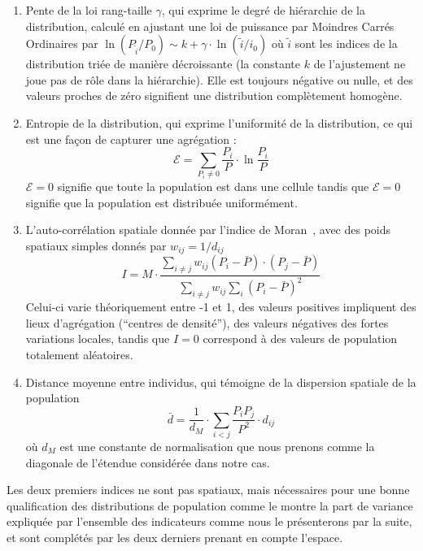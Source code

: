 {\begin{enumerate}
\item Pente de la loi rang-taille $\gamma$, qui exprime le degré de hiérarchie de la distribution, calculé en ajustant une loi de puissance par Moindres Carrés Ordinaires par $\ln \left( P_{\tilde{i}}/P_0\right) \sim k + \gamma\cdot \ln \left(\tilde{i}/i_0\right)$ où $\tilde{i}$ sont les indices de la distribution triée de manière décroissante (la constante $k$ de l'ajustement ne joue pas de rôle dans la hiérarchie). Elle est toujours négative ou nulle, et des valeurs proches de zéro signifient une distribution complètement homogène.
\item Entropie de la distribution, qui exprime l'uniformité de la distribution, ce qui est une façon de capturer une agrégation :
\begin{equation}
\mathcal{E} = \sum_{P_i\neq 0}\frac{P_i}{P}\cdot \ln{\frac{P_i}{P}}
\end{equation}
$\mathcal{E}=0$ signifie que toute la population est dans une cellule tandis que $\mathcal{E}=0$ signifie que la population est distribuée uniformément.
\item L'auto-corrélation spatiale donnée par l'indice de Moran~\cite{tsai2005quantifying}, avec des poids spatiaux simples donnés par $w_{ij} = 1/d_{ij}$
\[
I = M \cdot \frac{\sum_{i\neq j} w_{ij} \left(P_i - \bar{P}\right)\cdot\left(P_j - \bar{P}\right)}{\sum_{i\neq j} w_{ij} \sum_{i}{\left( P_i - \bar{P}\right)}^2}
\]
Celui-ci varie théoriquement entre -1 et 1, des valeurs positives impliquent des lieux d'agrégation (``centres de densité''), des valeurs négatives des fortes variations locales, tandis que $I=0$ correspond à des valeurs de population totalement aléatoires.
\item Distance moyenne entre individus, qui témoigne de la dispersion spatiale de la population
\[
\bar{d} = \frac{1}{d_M}\cdot \sum_{i<j} \frac{P_i P_j}{P^2} \cdot d_{ij}
\]
où $d_M$ est une constante de normalisation que nous prenons comme la diagonale de l'étendue considérée dans notre cas.
\end{enumerate}
}


Les deux premiers indices ne sont pas spatiaux, mais nécessaires pour une bonne qualification des distributions de population comme le montre la part de variance expliquée par l'ensemble des indicateurs comme nous le présenterons par la suite, et sont complétés par les deux derniers prenant en compte l'espace.


